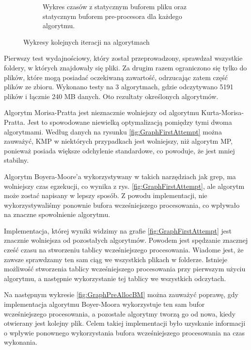 \begin{figure}
\begin{subfigure}{0.7\textwidth}
    \caption{Wykres czasów z statycznym buforem pliku oraz statycznym buforem
    pre-procesora dla każdego algorytmu.}
    \label{fig:GraphStaticPreallocAndFileBuffer}
\end{subfigure}
\caption{Wykresy kolejnych iteracji na algorytmach}
\label{fig:GraphsIterationComparison}
\end{figure}

Pierwszy test wydajnościowy, który został przeprowadzony, sprawdzał wszystkie 
foldery, w których znajdowały się pliki. Za drugim razem ograniczono się tylko
do plików, które mogą posiadać oczekiwaną zawartość, odrzucając zatem część 
plików ze zbioru. Wykonano testy na 3 algorytmach, gdzie odczytywano 5191 plików 
i łącznie 240 MB danych. Oto rezultaty określonych algorytmów.

Algorytm Morisa-Pratta jest nieznacznie wolniejszy od algorytmu 
Kurta-Morisa-Pratta. Jest to spowodowane niewielką optymalizacją pomiędzy tymi 
dwoma algorytmami. Według danych na rysunku \ref{fig:GraphFirstAttempt} można 
zauważyć, KMP w niektórych przypadkach jest wolniejszy, niż algorytm MP, 
ponieważ posiada większe odchylenie standardowe, co powoduje, że jest mniej
stabilny. 



Algorytm Boyera-Moore'a wykorzystywany w takich narzędziach jak grep, ma 
wolniejszy czas egzekucji, co wynika z rys. \ref{fig:GraphFirstAttempt}, ale 
algorytm może zostać napisany w lepszy sposób. Z powodu implementacji, nie 
wykorzystywaliśmy ponownie bufora wcześniejszego procesowania, co wpływało na znaczne
spowolnienie algorytmu.

Implementacja, której wyniki widzimy na grafie \ref{fig:GraphFirstAttempt} jest
znacznie wolniejsza od pozostałych algorytmów. Powodem jest spędzanie znacznej
cześć czasu na stworzeniu tablicy wcześniejszego procesowania. Wiadome jest, że zawsze 
sprawdzamy ten sam ciąg we wszystkich plikach w folderze. Istnieje możliwość 
stworzenia tablicy wcześniejszego procesowania przy pierwszym użyciu algorytmu, a następnie
wykorzystanie tej tablicy we wszystkich odczytach.

Na następnym wykresie \ref{fig:GraphPreAllocBM} można zauważyć poprawę, gdy
implementacja algorytmu Boyer-Moora wykorzystuje ten sam bufor wcześniejszego procesowania, a
pozostałe algorytmy tworzą go od nowa, kiedy otwierany jest kolejny plik. Celem 
takiej implementacji było uzyskanie informacji o wpływie ponownego wykorzystania
bufora wcześniejszego procesowania na czas wykonania. 

